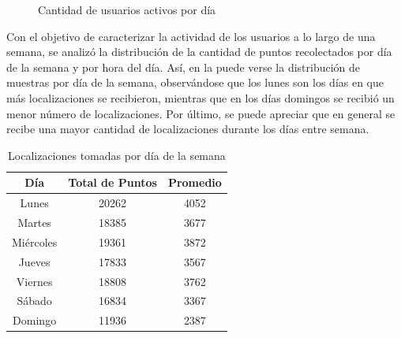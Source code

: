 \begin{figure}[h]
	\centering
	\caption{Cantidad de usuarios activos por día}
	\label{fig:cantidad_usuarios}
\end{figure}

Con el objetivo de caracterizar la actividad de los usuarios a lo largo de una semana, se analizó la distribución de la cantidad de puntos recolectados por día de la semana y por hora del día. Así, en la   puede verse la distribución de muestras por día de la semana, observándose que los lunes son los días en que más localizaciones se recibieron, mientras que en los días domingos se recibió un menor número de localizaciones. Por último, se puede apreciar que en general se recibe una mayor cantidad de localizaciones durante los días entre semana.

\begin{table}[h]
	\centering
	\begin{tabular}{ccc}
        \toprule
    	Día  & Total de Puntos & Promedio\\
    	\midrule
    	Lunes & 20262 & 4052 \\
    	Martes & 18385 & 3677 \\
    	Miércoles & 19361  & 3872 \\ 
    	Jueves & 17833 & 3567 \\
    	Viernes & 18808 & 3762 \\
    	Sábado & 16834 & 3367 \\
    	Domingo & 11936 & 2387 \\
    	\bottomrule
	\end{tabular}
	\caption{Localizaciones tomadas por día de la semana} 
	\label{table:localizaciones_por_dia}
\end{table}

